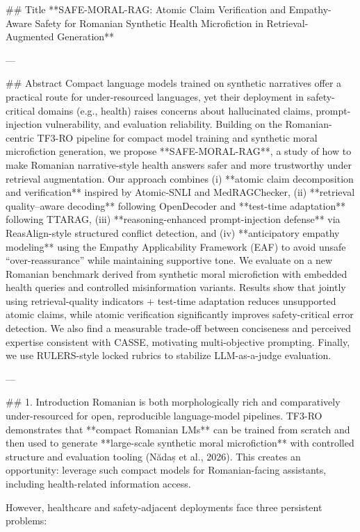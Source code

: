 ## Title
**SAFE-MORAL-RAG: Atomic Claim Verification and Empathy-Aware Safety for Romanian Synthetic Health Microfiction in Retrieval-Augmented Generation**

---

## Abstract
Compact language models trained on synthetic narratives offer a practical route for under-resourced languages, yet their deployment in safety-critical domains (e.g., health) raises concerns about hallucinated claims, prompt-injection vulnerability, and evaluation reliability. Building on the Romanian-centric TF3-RO pipeline for compact model training and synthetic moral microfiction generation, we propose **SAFE-MORAL-RAG**, a study of how to make Romanian narrative-style health answers safer and more trustworthy under retrieval augmentation. Our approach combines (i) **atomic claim decomposition and verification** inspired by Atomic-SNLI and MedRAGChecker, (ii) **retrieval quality–aware decoding** following OpenDecoder and **test-time adaptation** following TTARAG, (iii) **reasoning-enhanced prompt-injection defense** via ReasAlign-style structured conflict detection, and (iv) **anticipatory empathy modeling** using the Empathy Applicability Framework (EAF) to avoid unsafe “over-reassurance” while maintaining supportive tone. We evaluate on a new Romanian benchmark derived from synthetic moral microfiction with embedded health queries and controlled misinformation variants. Results show that jointly using retrieval-quality indicators + test-time adaptation reduces unsupported atomic claims, while atomic verification significantly improves safety-critical error detection. We also find a measurable trade-off between conciseness and perceived expertise consistent with CASSE, motivating multi-objective prompting. Finally, we use RULERS-style locked rubrics to stabilize LLM-as-a-judge evaluation.  

---

## 1. Introduction
Romanian is both morphologically rich and comparatively under-resourced for open, reproducible language-model pipelines. TF3-RO demonstrates that **compact Romanian LMs** can be trained from scratch and then used to generate **large-scale synthetic moral microfiction** with controlled structure and evaluation tooling (Nădaș et al., 2026). This creates an opportunity: leverage such compact models for Romanian-facing assistants, including health-related information access.

However, healthcare and safety-adjacent deployments face three persistent problems:

